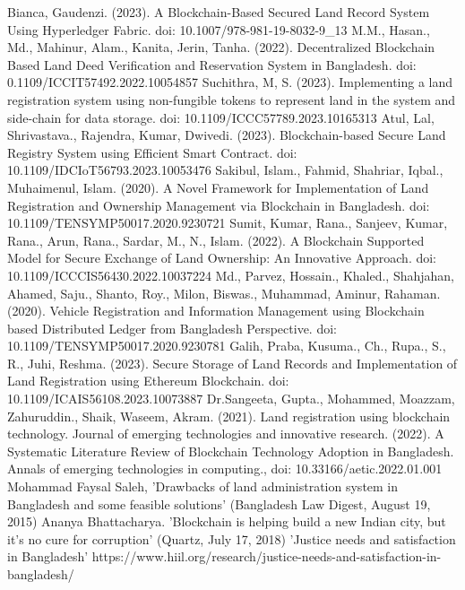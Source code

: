 \documentclass[conference]{IEEEtran}
\begin{document}
\begin{thebibliography}{00}
 Bianca, Gaudenzi. (2023). A Blockchain-Based Secured Land Record System Using Hyperledger Fabric.   doi: 10.1007/978-981-19-8032-9\_13
 M.M., Hasan., Md., Mahinur, Alam., Kanita, Jerin, Tanha. (2022). Decentralized Blockchain Based Land Deed Verification and Reservation System in Bangladesh.   doi: 0.1109/ICCIT57492.2022.10054857
 Suchithra, M, S. (2023). Implementing a land registration system using non-fungible tokens to represent land in the system and side-chain for data storage.   doi: 10.1109/ICCC57789.2023.10165313
 Atul, Lal, Shrivastava., Rajendra, Kumar, Dwivedi. (2023). Blockchain-based Secure Land Registry System using Efficient Smart Contract.   doi: 10.1109/IDCIoT56793.2023.10053476
 Sakibul, Islam., Fahmid, Shahriar, Iqbal., Muhaimenul, Islam. (2020). A Novel Framework for Implementation of Land Registration and Ownership Management via Blockchain in Bangladesh.   doi: 10.1109/TENSYMP50017.2020.9230721
 Sumit, Kumar, Rana., Sanjeev, Kumar, Rana., Arun, Rana., Sardar, M., N., Islam. (2022). A Blockchain Supported Model for Secure Exchange of Land Ownership: An Innovative Approach.   doi: 10.1109/ICCCIS56430.2022.10037224
 Md., Parvez, Hossain., Khaled., Shahjahan, Ahamed, Saju., Shanto, Roy., Milon, Biswas., Muhammad, Aminur, Rahaman. (2020). Vehicle Registration and Information Management using Blockchain based Distributed Ledger from Bangladesh Perspective.   doi: 10.1109/TENSYMP50017.2020.9230781
 Galih, Praba, Kusuma., Ch., Rupa., S., R., Juhi, Reshma. (2023). Secure Storage of Land Records and Implementation of Land Registration using Ethereum Blockchain.   doi: 10.1109/ICAIS56108.2023.10073887
 Dr.Sangeeta, Gupta., Mohammed, Moazzam, Zahuruddin., Shaik, Waseem, Akram. (2021). Land registration using blockchain technology. Journal of emerging technologies and innovative research.
 (2022). A Systematic Literature Review of Blockchain Technology Adoption in Bangladesh. Annals of emerging technologies in computing.,  doi: 10.33166/aetic.2022.01.001
 Mohammad Faysal Saleh, 'Drawbacks of land administration system in Bangladesh and some feasible solutions' (Bangladesh Law Digest, August 19, 2015)
 Ananya Bhattacharya. 'Blockchain is helping build a new Indian city, but it's no cure for corruption' (Quartz, July 17, 2018)
'Justice needs and satisfaction in Bangladesh' https://www.hiil.org/research/justice-needs-and-satisfaction-in-bangladesh/
\end{thebibliography}
\end{document}
